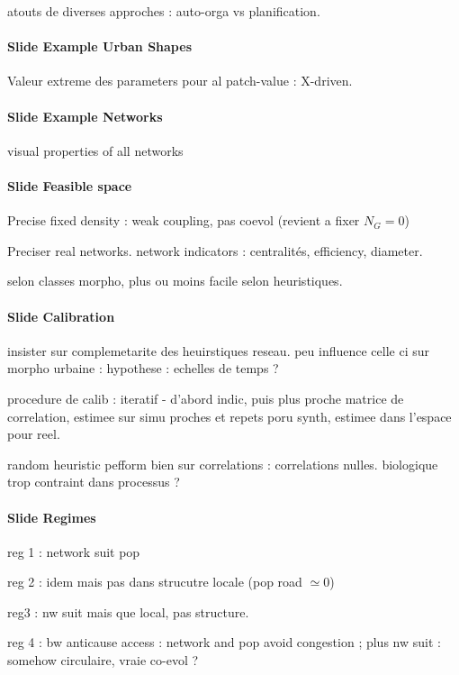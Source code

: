 \documentclass[11pt]{article}
\begin{document}
atouts de diverses approches : auto-orga vs planification.


\paragraph{Slide Example Urban Shapes}

Valeur extreme des parameters pour al patch-value : X-driven.


\paragraph{Slide Example Networks}

visual properties of all networks

\paragraph{Slide Feasible space}

Precise fixed density : weak coupling, pas coevol (revient a fixer $N_G = 0$)

Preciser real networks. network indicators : centralités, efficiency, diameter.

selon classes morpho, plus ou moins facile selon heuristiques.


\paragraph{Slide Calibration}

insister sur complemetarite des heuirstiques reseau. peu influence celle ci sur morpho urbaine : hypothese : echelles de temps ?

procedure de calib : iteratif - d'abord indic, puis plus proche matrice de correlation, estimee sur simu proches et repets poru synth, estimee dans l'espace pour reel.

random heuristic pefform bien sur correlations : correlations nulles. biologique trop contraint dans processus ?


\paragraph{Slide Regimes}

reg 1 : network suit pop

reg 2 : idem mais pas dans strucutre locale (pop road $\simeq 0$)

reg3 : nw suit mais que local, pas structure. 

reg 4 : bw anticause access : network and pop avoid congestion ; plus nw suit : somehow circulaire, vraie co-evol ?
\end{document}
